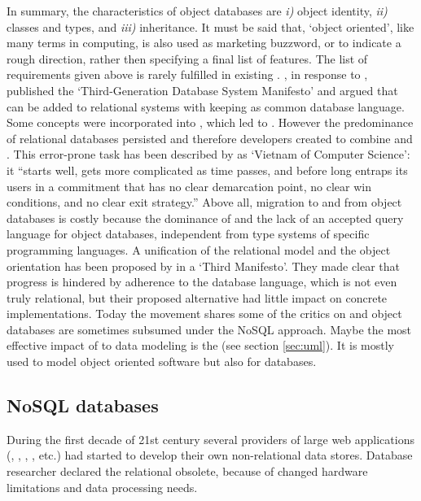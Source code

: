 In summary, the characteristics of object databases are
\textit{i)} object identity, \textit{ii)} classes
and types, and \textit{iii)} inheritance. It must be said that, `object
oriented', like many terms in computing, is also used as marketing buzzword,
or to indicate a rough direction, rather then specifying a final list of
features. The list of requirements given above is rarely fulfilled in existing
. \textcite{Stonebraker1990}, in response to
\textcite{Atkinson1989}, published the `Third-Generation Database System
Manifesto' and argued that 
can be added to relational systems with keeping  as common database
language. Some  concepts were incorporated into ,
which led to . However the
predominance of relational databases persisted and therefore developers created
 to combine  and . 
This error-prone task has been described by \textcite{Neward2006} as 
`Vietnam of Computer Science': it ``starts well, gets more complicated as time
passes, and before long entraps its users in a commitment that has no clear
demarcation point, no clear win conditions, and no clear exit strategy.''
Above all, migration to and from object databases is costly because the
dominance of  and the lack of an accepted query language for object
databases, independent from type systems of specific programming languages.
A unification of the relational model and the object orientation has been
proposed by \textcite{Darwen1995} in a `Third Manifesto'. They made clear
that progress is hindered by adherence to the  database language,
which is not even truly relational, but their proposed alternative
 \cite{Date2006} had little impact on concrete implementations.
Today the  movement shares some of the critics on  and
object databases are sometimes subsumed under the NoSQL approach. Maybe
the most effective impact of  to data modeling is the
 (see section \ref{sec:uml}). It is
mostly used to model object oriented software but also for databases.


\subsection{NoSQL databases}
\label{sec:nosql}
During the first decade of 21st century several providers of large web
applications (, , , ,
etc.) had started to develop their own non-relational data stores. Database
researcher \textcite{Stonebraker2007} declared the relational 
obsolete, because of changed hardware limitations and data processing needs.


